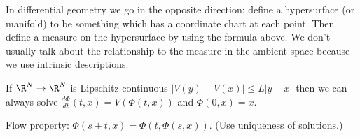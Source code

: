 In differential geometry we go in the opposite direction: define a hypersurface (or manifold) to be something which has a coordinate chart at each point. Then define a measure on the hypersurface by using the formula above. We don't usually talk about the relationship to the measure in the ambient space because we use intrinsic descriptions. %

If $\R^N\to \R^N$ is Lipschitz continuous $|V(y)-V(x)|\le L|y-x|$ then we can always solve $\frac{d\Phi}{dt}(t,x)=V(\Phi(t,x))$ and $\Phi(0,x)=x$.

Flow property: $\Phi(s+t,x)=\Phi(t,\Phi(s,x))$. (Use uniqueness of solutions.)

